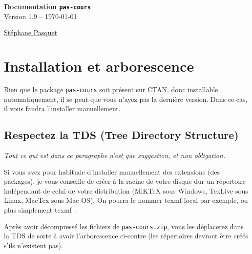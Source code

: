 \documentclass[a4paper,french]{article}
\begin{document}
\begin{center}
\begin{tcolorbox}[head]
{\bfseries\LARGE Documentation \texttt{pas-cours} }\\[3mm]
{\large Version 1.9 -- \today}
\end{tcolorbox}

{\large 
\href{http://www.mathweb.fr/contact.html}{Stéphane Pasquet}}
\end{center}

\begin{tcolorbox}[toc]
\makeatletter
{}
\makeatother
\end{tcolorbox}

\newpage

\section{Installation et arborescence}

Bien que le package \texttt{pas-cours} soit présent sur CTAN, donc installable automatiquement, il se peut que vous n'ayez pas la dernière version. Dans ce cas, il vous faudra l'installer manuellement.

\subsection{Respectez la TDS (Tree Directory Structure)}

\textit{Tout ce qui est dans ce paragraphe n'est que suggestion, et non obligation.}

\bigskip

\begin{minipage}{\dimexpr\linewidth-9cm}
Si vous avez pour habitude d'installer manuellement des extensions (des packages), je vous conseille de créer à la racine de votre disque dur un répertoire indépendant de celui de votre distribution (MiKTeX sous Windows, TexLive sous Linux, MacTex sous Mac OS). On pourra le nommer \og texmf-local \fg{} par exemple, ou plus simplement \og texmf \fg.

\medskip

Après avoir décompressé les fichiers de \texttt{pas-cours.zip}, vous les déplacerez dans la TDS de sorte à avoir l'arborescence ci-contre (les répertoires devront être créés s'ils n'existent pas).
\end{minipage}
\hfill
{}
\end{document}
